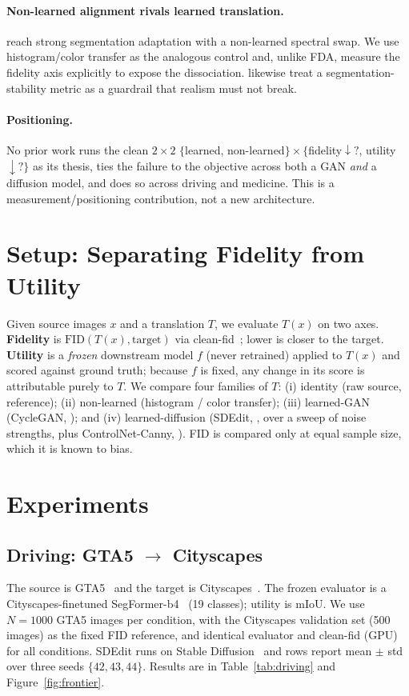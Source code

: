 \paragraph{Non-learned alignment rivals learned translation.}
\citet{yang2020fda} reach strong segmentation adaptation with a non-learned
spectral swap. We use histogram/color transfer as the analogous control and,
unlike FDA, measure the fidelity axis explicitly to expose the dissociation.
\citet{richter2022enhancing} likewise treat a segmentation-stability metric as a
guardrail that realism must not break.

\paragraph{Positioning.} No prior work runs the clean $2\times2$
$\{$learned, non-learned$\}\times\{$fidelity$\downarrow?$, utility$\downarrow?\}$
as its thesis, ties the failure to the objective across both a GAN \emph{and} a
diffusion model, and does so across driving and medicine. This is a
measurement/positioning contribution, not a new architecture.

\section{Setup: Separating Fidelity from Utility}
\label{sec:setup}
Given source images $x$ and a translation $T$, we evaluate $T(x)$ on two axes.
\textbf{Fidelity} is $\mathrm{FID}(T(x),\text{target})$ via
clean-fid~\citep{parmar2022cleanfid}; lower is closer to the target.
\textbf{Utility} is a \emph{frozen} downstream model $f$ (never retrained) applied
to $T(x)$ and scored against ground truth; because $f$ is fixed, any change in its
score is attributable purely to $T$. We compare four families of $T$:
(i) identity (raw source, reference); (ii) non-learned (histogram / color
transfer); (iii) learned-GAN (CycleGAN, \citealp{zhu2017cyclegan}); and
(iv) learned-diffusion (SDEdit, \citealp{meng2022sdedit}, over a sweep of noise
strengths, plus ControlNet-Canny, \citealp{zhang2023controlnet}). FID is compared
only at equal sample size, which it is known to bias.

\section{Experiments}

\subsection{Driving: GTA5 $\rightarrow$ Cityscapes}
The source is GTA5~\citep{richter2016playing} and the target is
Cityscapes~\citep{cordts2016cityscapes}. The frozen evaluator is a
Cityscapes-finetuned SegFormer-b4~\citep{xie2021segformer} (19 classes); utility is
mIoU. We use $N{=}1000$ GTA5 images per condition, with the Cityscapes validation
set (500 images) as the fixed FID reference, and identical evaluator and clean-fid
(GPU) for all conditions. SDEdit runs on Stable Diffusion~\citep{rombach2022ldm}
and rows report mean $\pm$ std over three seeds $\{42,43,44\}$. Results are in
Table~\ref{tab:driving} and Figure~\ref{fig:frontier}.

